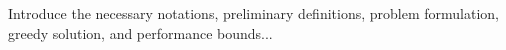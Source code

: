 \documentclass[letterpaper, 10 pt, conference]{ieeeconf}
\newcommand{\R}{\mathbb{R}}
\newtheorem{definition}{Definition}
\begin{document}
Introduce the necessary notations, preliminary definitions, problem formulation, greedy solution, and performance bounds...





\end{document}
